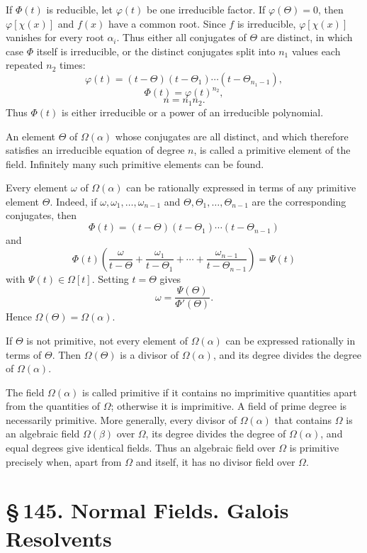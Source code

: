 \documentclass[11pt]{article}
\providecommand{\sect}[2]{\section*{\S\,#1. #2}}
\begin{document}
If $\Phi(t)$ is reducible, let $\varphi(t)$ be one irreducible factor. If $\varphi(\Theta)=0$, then $\varphi[\chi(x)]$ and $f(x)$ have a common root. Since $f$ is irreducible, $\varphi[\chi(x)]$ vanishes for every root $\alpha_i$. Thus either all conjugates of $\Theta$ are distinct, in which case $\Phi$ itself is irreducible, or the distinct conjugates split into $n_1$ values each repeated $n_2$ times:
\[
\tag{10}
        \varphi(t)=(t-\Theta)(t-\Theta_1)\cdots(t-\Theta_{n_1-1}),
\]
\[
\tag{11}
        \Phi(t)=\varphi(t)^{n_2},
\]
\[
\tag{12}
        n=n_1n_2.
\]
Thus $\Phi(t)$ is either irreducible or a power of an irreducible polynomial.

An element $\Theta$ of $\Omega(\alpha)$ whose conjugates are all distinct, and which therefore satisfies an irreducible equation of degree $n$, is called a primitive element of the field. Infinitely many such primitive elements can be found.

Every element $\omega$ of $\Omega(\alpha)$ can be rationally expressed in terms of any primitive element $\Theta$. Indeed, if $\omega,\omega_1,\ldots,\omega_{n-1}$ and $\Theta,\Theta_1,\ldots,\Theta_{n-1}$ are the corresponding conjugates, then
\[
        \Phi(t)=(t-\Theta)(t-\Theta_1)\cdots(t-\Theta_{n-1})
\]
and
\[
        \Phi(t)\left(
        \frac{\omega}{t-\Theta}+
        \frac{\omega_1}{t-\Theta_1}+\cdots+
        \frac{\omega_{n-1}}{t-\Theta_{n-1}}
        \right)=\Psi(t)
\]
with $\Psi(t)\in\Omega[t]$. Setting $t=\Theta$ gives
\[
        \omega=\frac{\Psi(\Theta)}{\Phi'(\Theta)}.
\]
Hence $\Omega(\Theta)=\Omega(\alpha)$.

If $\Theta$ is not primitive, not every element of $\Omega(\alpha)$ can be expressed rationally in terms of $\Theta$. Then $\Omega(\Theta)$ is a divisor of $\Omega(\alpha)$, and its degree divides the degree of $\Omega(\alpha)$.

The field $\Omega(\alpha)$ is called primitive if it contains no imprimitive quantities apart from the quantities of $\Omega$; otherwise it is imprimitive. A field of prime degree is necessarily primitive. More generally, every divisor of $\Omega(\alpha)$ that contains $\Omega$ is an algebraic field $\Omega(\beta)$ over $\Omega$, its degree divides the degree of $\Omega(\alpha)$, and equal degrees give identical fields. Thus an algebraic field over $\Omega$ is primitive precisely when, apart from $\Omega$ and itself, it has no divisor field over $\Omega$.

\sect{145}{Normal Fields. Galois Resolvents}
\end{document}
